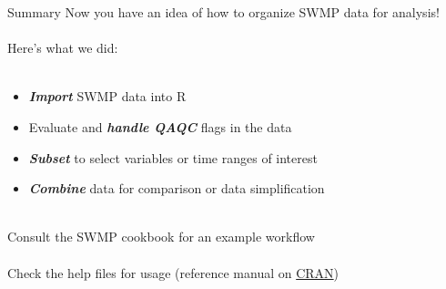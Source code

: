 \documentclass[xcolor=dvipsnames]{beamer}\usepackage[]{graphicx}\usepackage[]{color}
\newcommand{\Bigtxt}[1]{\textbf{\textit{#1}}}
\begin{document}
\begin{frame}[fragile]{Summary}
Now you have an idea of how to organize SWMP data for analysis!\\~\\
Here's what we did: \\~\\
\begin{itemize}
\item \Bigtxt{Import} SWMP data into R
\item Evaluate and \Bigtxt{handle QAQC} flags in the data 
\item \Bigtxt{Subset} to select variables or time ranges of interest 
\item \Bigtxt{Combine} data for comparison or data simplification \\~\\
\end{itemize}
Consult the SWMP cookbook for an example workflow\\~\\
Check the help files for usage (reference manual on \href{https://cran.r-project.org/web/packages/SWMPr/index.html}{CRAN})
\end{frame}
\end{document}
